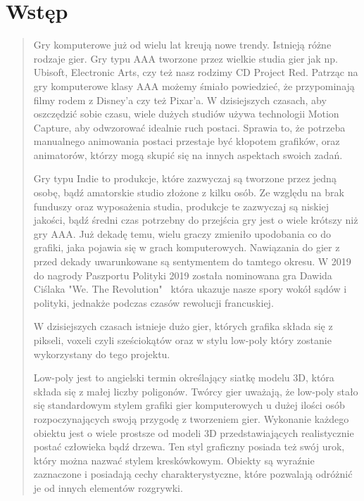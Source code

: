 \chapter*{Wstęp}
\begin{quotation}
\indent Gry komputerowe już od wielu lat kreują nowe trendy. Istnieją różne rodzaje gier.
Gry typu AAA tworzone przez wielkie studia gier jak np. Ubisoft, Electronic Arts, czy też nasz rodzimy CD Project Red. 
Patrząc na gry komputerowe klasy AAA możemy śmiało powiedzieć, że przypominają filmy rodem z Disney'a czy też Pixar'a. 
W dzisiejszych czasach, aby oszczędzić sobie czasu, wiele dużych studiów używa technologii Motion Capture, aby odwzorować idealnie ruch postaci. Sprawia to,
że potrzeba manualnego animowania postaci przestaje być kłopotem grafików, oraz animatorów, którzy mogą skupić się na innych aspektach swoich zadań.

\indent Gry typu Indie to produkcje, które zazwyczaj są tworzone przez jedną osobę, bądź amatorskie studio złożone z kilku osób. Ze względu na brak funduszy oraz wyposażenia studia, produkcje te zazwyczaj są niskiej jakości, bądź średni czas potrzebny do przejścia gry jest o wiele krótszy niż gry AAA. Już dekadę temu, wielu graczy zmieniło upodobania co do grafiki, jaka pojawia się w grach komputerowych. Nawiązania do gier z przed dekady uwarunkowane są sentymentem do tamtego okresu. W 2019 do nagrody Paszportu Polityki 2019 została nominowana gra Dawida Ciślaka "We. The Revolution" ~która ukazuje nasze spory wokół sądów i polityki, jednakże podczas czasów rewolucji francuskiej.

\indent W dzisiejszych czasach istnieje dużo gier, których grafika składa się z pikseli, voxeli czyli sześciokątów oraz w stylu low-poly który zostanie wykorzystany do tego projektu.

\indent Low-poly jest to angielski termin określający siatkę modelu 3D, która składa się z małej liczby poligonów. Twórcy gier uważają, że low-poly stało się standardowym stylem grafiki gier komputerowych u dużej ilości osób rozpoczynających swoją przygodę z tworzeniem gier. Wykonanie każdego obiektu jest o wiele prostsze od modeli 3D przedstawiających realistycznie postać człowieka bądź drzewa. Ten styl graficzny posiada też swój urok, który można nazwać stylem kreskówkowym. Obiekty są wyraźnie zaznaczone i posiadają cechy charakterystyczne, które pozwalają odróżnić je od innych elementów rozgrywki.

\newpage 
\end{quotation}

